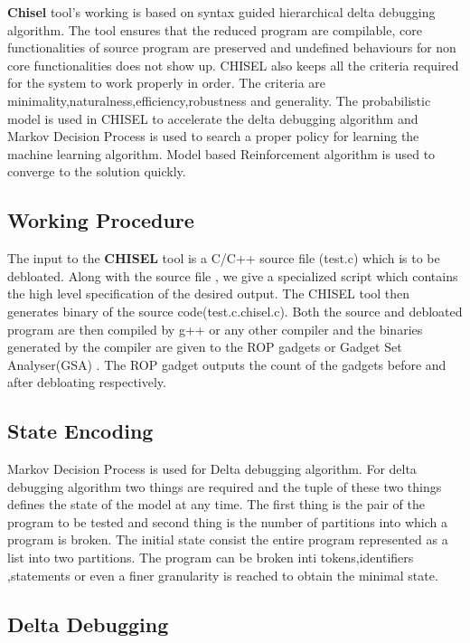 \documentclass{relatorio}
\begin{document}
\textbf{Chisel} tool's working is based on syntax guided hierarchical delta debugging algorithm. The tool ensures that the reduced program are compilable, core functionalities of source program are preserved  and undefined behaviours for non core functionalities does not show up. CHISEL also keeps all the criteria required for the system to work properly in order. The criteria are minimality,naturalness,efficiency,robustness and generality. The probabilistic model is used in CHISEL to accelerate the delta debugging algorithm and Markov Decision Process is used to search a proper policy for learning the machine learning algorithm. Model based Reinforcement algorithm is used to converge to the solution quickly.

\subsection{Working Procedure}%
\label{Tools}

The input to the \textbf{CHISEL} tool is a C/C++ source file (test.c) which is to be debloated. Along with the source file , we give a specialized script which contains the high level specification of the desired output. The CHISEL tool then generates binary of the source code(test.c.chisel.c). Both the source and debloated program are then compiled by g++ or any other compiler and the binaries generated by the compiler are given to the ROP gadgets or Gadget Set Analyser(GSA) . The ROP gadget outputs the count of the  gadgets before and after debloating respectively.

\subsection{State Encoding}%
\label{Tools}

Markov Decision Process is used for Delta debugging algorithm. For  delta debugging algorithm two things are required and the tuple of these two things defines the state of the model at any time. The first thing is the pair of the program to be tested and second thing is the number of partitions into which a program is broken. The initial state consist the entire program  represented as a list into two partitions. The program can be broken inti tokens,identifiers ,statements or even a finer granularity is reached to obtain the minimal state.

\subsection{Delta Debugging}%
\label{Tools}
\end{document}
